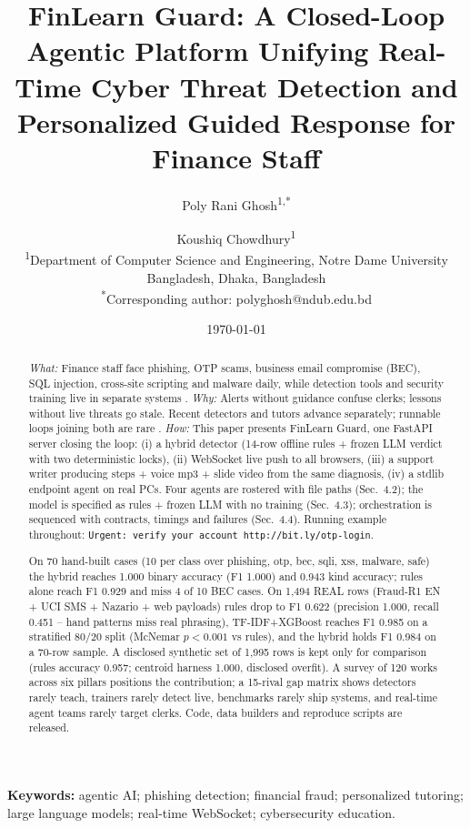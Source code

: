 \documentclass[11pt,a4paper]{article}
\title{FinLearn Guard: A Closed-Loop Agentic Platform Unifying Real-Time Cyber Threat Detection and Personalized Guided Response for Finance Staff}
\author{Poly Rani Ghosh\textsuperscript{1,*} \and Koushiq Chowdhury\textsuperscript{1} \\
\small \textsuperscript{1}Department of Computer Science and Engineering, Notre Dame University Bangladesh, Dhaka, Bangladesh \\
\small \textsuperscript{*}Corresponding author: polyghosh@ndub.edu.bd }
\date{\today}
\begin{document}
\maketitle
\begin{abstract}
\noindent\textit{What:} Finance staff face phishing, OTP scams, business email compromise (BEC), SQL injection, cross-site scripting and malware daily, while detection tools and security training live in separate systems \cite{Heiding24,Koide24,Desolda24,Nair25}.
\textit{Why:} Alerts without guidance confuse clerks; lessons without live threats go stale. Recent detectors \cite{Koide24,Desolda24,SAGE26,UserRAG26} and tutors \cite{SENSAI25,SYNAPSE26,Frazier26} advance separately; runnable loops joining both are rare \cite{SAGE26,FraudR125,FinAgentBench25}.
\textit{How:} This paper presents FinLearn Guard, one FastAPI server closing the loop: (i) a hybrid detector (14-row offline rules + frozen LLM verdict with two deterministic locks), (ii) WebSocket live push to all browsers, (iii) a support writer producing steps + voice mp3 + slide video from the same diagnosis, (iv) a stdlib endpoint agent on real PCs. Four agents are rostered with file paths (Sec.~4.2); the model is specified as rules + frozen LLM with no training (Sec.~4.3); orchestration is sequenced with contracts, timings and failures (Sec.~4.4). Running example throughout: \texttt{Urgent: verify your account http://bit.ly/otp-login}.

On 70 hand-built cases (10 per class over phishing, otp, bec, sqli, xss, malware, safe) the hybrid reaches 1.000 binary accuracy (F1 1.000) and 0.943 kind accuracy; rules alone reach F1 0.929 and miss 4 of 10 BEC cases. On 1,494 REAL rows (Fraud-R1 EN + UCI SMS + Nazario + web payloads) rules drop to F1 0.622 (precision 1.000, recall 0.451 -- hand patterns miss real phrasing), TF-IDF+XGBoost reaches F1 0.985 on a stratified 80/20 split (McNemar $p<0.001$ vs rules), and the hybrid holds F1 0.984 on a 70-row sample. A disclosed synthetic set of 1,995 rows is kept only for comparison (rules accuracy 0.957; centroid harness 1.000, disclosed overfit). A survey of 120 works across six pillars positions the contribution; a 15-rival gap matrix shows detectors rarely teach, trainers rarely detect live, benchmarks rarely ship systems, and real-time agent teams rarely target clerks. Code, data builders and reproduce scripts are released.
\end{abstract}

\noindent\textbf{Keywords:} agentic AI; phishing detection; financial fraud; personalized tutoring; large language models; real-time WebSocket; cybersecurity education.
\end{document}
